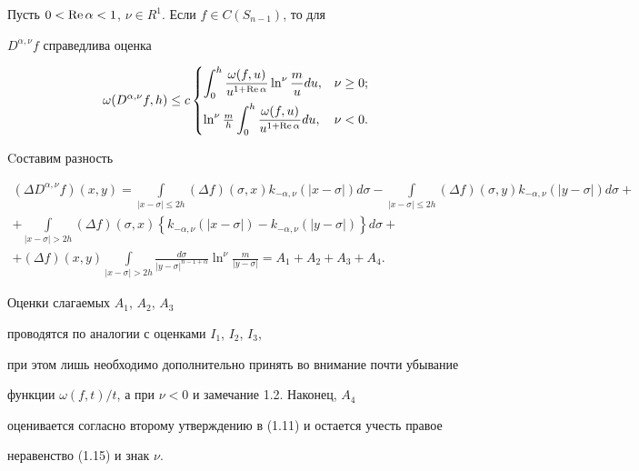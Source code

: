 \begin{thms}


Пусть $0 < \operatorname{Re} \alpha < 1$, $\nu\in R^1$. Если $f\in C(S_{n-1})$, то для


$D^{\alpha,\nu}f $ справедлива оценка


$$


\omega (D^{\alpha,\nu} f,h) \le c


\begin{cases}


\displaystyle \int_0^h \dfrac{\omega(f,u)}


{u^{1+\re \alpha}} \ln^\nu \frac{m}{u} du, & \nu \ge 0;\\[3mm]


\ln^\nu \frac{m}{h} \displaystyle\int_0^h \frac{\omega(f,u)}


{u^{1+\re \alpha}} du, & \nu <0. 


\end{cases}


$$


\end{thms}





\begin{pf}


Cоставим разность


\begin{multline}


(\Delta D^{\alpha,\nu} f)(x,y) = 


\int \limits_{|x-\sigma|\le 2h} 


(\Delta f)(\sigma,x){k}_{-\alpha,\nu} (|x-\sigma|)d\sigma-


\int \limits_{|x-\sigma| \le 2h} (\Delta f)(\sigma, y){k}_{-


\alpha,\nu} (|y-\sigma|) d\sigma + \\


+ \int \limits_{|x-\sigma|>2h} (\Delta f)(\sigma, x)\left\{{k}_{-


\alpha,\nu} (|x-\sigma|) -{k}_{-\alpha,\nu} (|y-\sigma|) \right\}


d\sigma+ \\


+ (\Delta f)(x,y)\int \limits_{|x-\sigma|>2h} \frac{d\sigma}{|y-\sigma|


^{n-1+\alpha}} \ln^\nu \frac{m}{|y-\sigma|} = A_1 + A_2 + A_3 + A_4.


\end{multline}


Оценки слагаемых $A_1$, $A_2$, $A_3$ 


проводятся по аналогии с оценками $I_1$, $I_2$, $I_3$,


при этом лишь необходимо дополнительно принять во внимание почти убывание


функции $\omega(f,t)/t$, а при $\nu<0$ и замечание 1.2. Наконец, $A_4$


оценивается согласно второму утверждению в (1.11) и остается учесть правое


неравенство (1.15) и знак $\nu$.


\end{pf}





